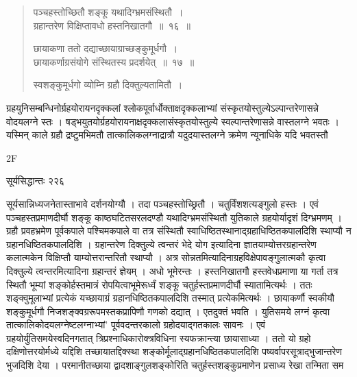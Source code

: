 \documentclass[11pt, openany]{book}
\begin{document}

\begin{quote}
{\ssi पञ्चहस्तोच्छितौ शङ्कू यथादिग्भ्रमसंस्थितौ~।\\
 ग्रहान्तरेण विक्षिप्तावधो हस्तनिखातगौ~॥~१६~॥

छायाकणा ततो दद्याच्छायाग्राच्छङ्कुमूर्धगौ~।\\
छायाकर्णाग्रसंयोगे संस्थितस्य प्रदर्शयेत्~॥~१७~॥

स्वशङ्कुमूर्धगो व्योम्नि ग्रहौ दिक्तुल्यतामितौ~।\\}
\end{quote}
\vspace{2mm}


 ग्रहयुनिसम्बन्धिनोर्ग्रहयोरायनदृक्कलां श्लोकपूर्वार्धोक्ताक्षदृक्कलाभ्यां संस्कृतयोस्तुल्येऽल्पान्तरेणासन्ने वोदयलग्ने स्तः । षड्भयुतयोर्ग्रहयोरायनाक्षदृक्कलासंस्कृतयोस्तुल्ये स्वल्पान्तरेणासन्ने वास्तलग्ने भवतः । यस्मिन् काले ग्रहौ द्रष्टुमभिमतौ तात्कालिकलग्नाद्रात्रौ यदुदयास्तलग्ने क्रमेण न्यूनाधिके यदि भवतस्तौ \textendash


{\tiny{2F}}

\newpage


\hspace{3.5cm} सूर्यसिद्धान्तः \hfill २२६
\vspace{1cm}


\noindent सूर्यसान्निध्यजनेतास्ताभावे दर्शनयोग्यौ । तदा पञ्चहस्तोच्छ्रितौ । चतुर्विंशशत्यङ्गुलो हस्तः । एवं पञ्चहस्तप्रमाणदीर्घौ शङ्कू काष्ठघटितसरलदण्डौ यथादिग्भ्रमसंस्थितौ युतिकाले ग्रहयोर्यादृशं दिग्भ्रमणम् । ग्रहौ प्रवहभ्रमेण पूर्वकपाले पश्चिमकपाले वा तत्र संस्थितौ स्वाधिष्ठितस्थानाद्ग्रहाधिष्ठितकपालदिशि स्थाप्यौ न ग्रहानधिष्ठितकपालदिशि । ग्रहान्तरेण दिक्तुल्ये त्वन्तरं भेदे योग इत्यादिना ज्ञातयाम्योत्तरग्रहान्तरेण कलात्मकेन विक्षिप्तौ याम्योत्तरान्तरितौ स्थाप्यौ । अत्र सोन्नतमित्यादिनाग्रहविक्षेपावङ्गुलात्मकौ कृत्वा दिक्तुल्ये त्वन्तरमित्यादिना ग्रहान्तरं ज्ञेयम् । अधो भूमेरन्तः । हस्तनिखातगौ हस्तवेधप्रमाणा या गर्ता तत्र स्थितौ भूम्यां शङ्कोर्हस्तमात्रं रोपयित्वाभूमेरूर्ध्वं शङ्कू चतुर्हस्तप्रमाणदीर्घौ स्यातामित्यर्थः । ततः शङ्क्वुमूलाभ्यां प्रत्येकं यच्छायाग्रं ग्रहानधिष्ठितकपालदिशि तस्मात् प्रत्येकमित्यर्थः । छायाकर्णौ स्वकीयौ शङ्कुमूर्धगौ निजशङ्क्वग्ररूपमस्तकप्रापिणौ गणको दद्यात् । एतदुक्तं भवति । युतिसमये लग्नं कृत्वा तात्कालिकोदयलग्नेष्टलग्नाभ्यां' पूर्ववदन्तरकालो ग्रहोदयाद्गतकालः सावनः । एवं ग्रहयोर्युतिसमयेस्वदिनगतात् त्रिप्रश्नाधिकारोक्त्रविधिना स्यफक्रान्त्या छायासाध्या । ततो यो ग्रहो दक्षिणोत्तरयोर्मध्ये यद्दिशि तच्छायातद्दिक्स्था शङ्कोर्मूलाद्ग्रहानधिष्ठितकपालदिशि पष्यर्वापरसूत्राद्भुजान्तरेण भुजदिशि देया । परमानीतच्छाया द्वादशाङ्गुलशङ्कोरिति चतुर्हस्तशङ्कुप्रमाणेन प्रसाध्य रेखा तन्मिता सम\textendash
\end{document}
